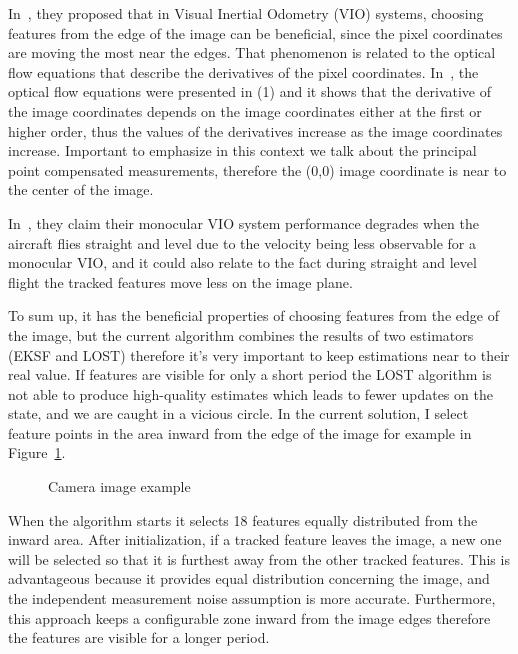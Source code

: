 In~\cite{image-based-INS}, they proposed that in Visual Inertial Odometry (VIO) systems, choosing features from the edge of the image can be beneficial, since the pixel coordinates are moving the most near the edges. That phenomenon is related to the optical flow equations that describe the derivatives of the pixel coordinates. In~\cite{optic-flow}, the optical flow equations were presented in (1) and it shows that the derivative of the image coordinates depends on the image coordinates either at the first or higher order, thus the values of the derivatives increase as the image coordinates increase. Important to emphasize in this context we talk about the principal point compensated measurements, therefore the (0,0) image coordinate is near to the center of the image.

In~\cite{rel-nav}, they claim their monocular VIO system performance degrades when the aircraft flies straight and level due to the velocity being less observable for a monocular VIO, and it could also relate to the fact during straight and level flight the tracked features move less on the image plane.

To sum up, it has the beneficial properties of choosing features from the edge of the image, but the current algorithm combines the results of two estimators (EKSF and LOST) therefore it's very important to keep estimations near to their real value. If features are visible for only a short period the LOST algorithm is not able to produce high-quality estimates which leads to fewer updates on the state, and we are caught in a vicious circle. In the current solution, I select feature points in the area inward from the edge of the image for example in Figure~\ref{fig:camera-image}.

\begin{figure}[!ht]
    \centering
    
    \caption{Camera image example}\label{fig:camera-image}
\end{figure}

When the algorithm starts it selects 18 features equally distributed from the inward area. After initialization, if a tracked feature leaves the image, a new one will be selected so that it is furthest away from the other tracked features. This is advantageous because it provides equal distribution concerning the image, and the independent measurement noise assumption is more accurate. Furthermore, this approach keeps a configurable zone inward from the image edges therefore the features are visible for a longer period.

